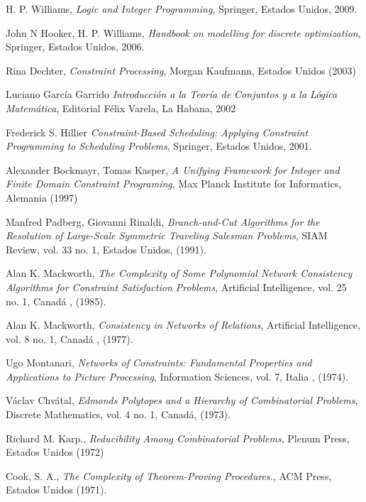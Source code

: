 \documentclass[12pt]{report}
\begin{document}
\begin{thebibliography}{8}

H. P. Williams, \textit{Logic and Integer Programming}, Springer, Estados Unidos, 2009.

John N Hooker, H. P. Williams, \textit{Handbook on modelling for discrete optimization}, Springer, Estados Unidos, 2006.

Rina Dechter, \textit{Constraint Processing}, Morgan Kaufmann, Estados Unidos (2003)

Luciano García Garrido \textit{Introducción a la Teoría de Conjuntos y a la Lógica Matemática}, Editorial Félix Varela, La Habana, 2002

Frederick S. Hillier \textit{Constraint-Based Scheduling: Applying Constraint Programming to Scheduling Problems}, Springer, Estados Unidos, 2001.

Alexander Bockmayr, Tomas Kasper, \textit{A Unifying Framework for Integer and Finite Domain Constraint Programing}, Max Planck Institute for Informatics, Alemania (1997)

Manfred Padberg, Giovanni Rinaldi, \textit{Branch-and-Cut Algorithms for the Resolution of Large-Scale Symmetric Traveling Salesman Problems}, SIAM Review, vol. 33 no. 1, Estados Unidos, (1991).

Alan K. Mackworth, \textit{The Complexity of Some Polynomial Network Consistency Algorithms for Constraint Satisfaction Problems}, Artificial Intelligence, vol. 25 no. 1, Canadá , (1985).

Alan K. Mackworth, \textit{Consistency in Networks of Relations}, Artificial Intelligence, vol. 8 no. 1, Canadá , (1977).

Ugo Montanari, \textit{Networks of Constraints: Fundamental Properties and Applications to Picture Processing}, Information Sciences, vol. 7, Italia , (1974).

Václav Chvátal, \textit{Edmonds Polytopes and a Hierarchy of Combinatorial Problems}, Discrete Mathematics, vol. 4 no. 1, Canadá, (1973).

Richard M. Karp., \textit{Reducibility Among Combinatorial Problems}, Plenum Press, Estados Unidos (1972)

Cook, S. A., \textit{The Complexity of Theorem-Proving Procedures.}, ACM Press, Estados Unidos (1971).


\end{thebibliography}
\end{document}
